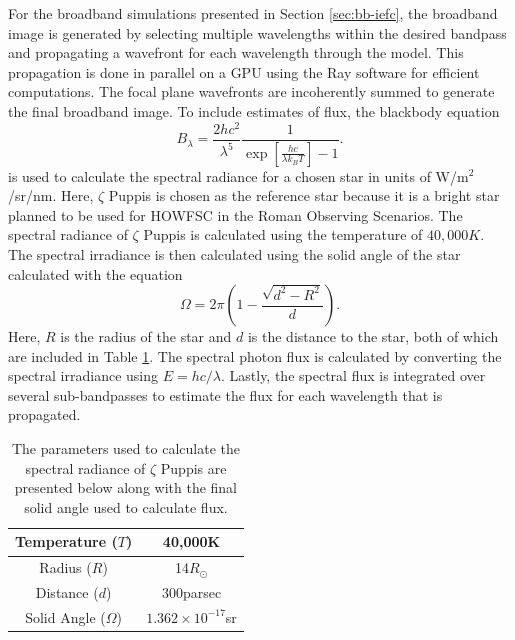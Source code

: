 \documentclass[12pt]{spieman}  %
\begin{document}
\begin{spacing}{2}
For the broadband simulations presented in Section \ref{sec:bb-iefc}, the broadband image is generated by selecting multiple wavelengths within the desired bandpass and propagating a wavefront for each wavelength through the model. This propagation is done in parallel on a GPU using the Ray\cite{moritz2018ray} software for efficient computations. The focal plane wavefronts are incoherently summed to generate the final broadband image. To include estimates of flux, the blackbody equation \begin{equation}\label{eq:blackbody}B_{\lambda} = \frac{2hc^2}{\lambda^5} \frac{1}{\exp{[\frac{hc}{\lambda k_B T}]} - 1}.\end{equation}is used to calculate the spectral radiance for a chosen star in units of W/m$^2$/sr/nm\cite{grant-field-guide-radiometry-2011}. Here, $\zeta$ Puppis is chosen as the reference star because it is a bright star planned to be used for HOWFSC in the Roman Observing Scenarios\cite{krist-spc-wfov-os11}. The spectral radiance of $\zeta$ Puppis is calculated using the temperature of $40,000K$\cite{zeta-pup-temp}. The spectral irradiance is then calculated using the solid angle of the star calculated with the equation \begin{equation} \Omega=2\pi\left(1-\frac{\sqrt{d^2-R^2}}{d}\right)\text{.}\end{equation} Here, $R$ is the radius of the star and $d$ is the distance to the star, both of which are included in Table \ref{tab:zeta-pup-params}. The spectral photon flux is calculated by converting the spectral irradiance using $E=hc/\lambda$. Lastly, the spectral flux is integrated over several sub-bandpasses to estimate the flux for each wavelength that is propagated. 

\begin{table}[h]
    \centering
    \caption{The parameters used to calculate the spectral radiance of $\zeta$ Puppis are presented below along with the final solid angle used to calculate flux.}
    \begin{tabular}{|c|c||} \hline
       Temperature ($T$) & 40,000K\cite{zeta-pup-temp} \\ \hline 
       Radius ($R$) & 14$R_\odot$\cite{zeta-pup-radius} \\ \hline 
       Distance ($d$) & 300parsec\cite{zeta-pup-radius} \\ \hline 
       Solid Angle ($\Omega$) & $1.362\times10^{-17}$sr \\ \hline
    \end{tabular}
    \label{tab:zeta-pup-params}
\end{table}


\end{spacing}
\end{document}
